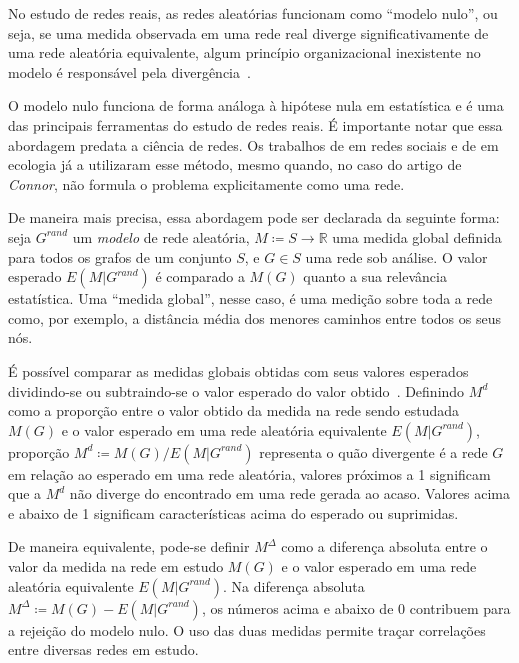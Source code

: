 \documentclass[12pt,a4paper,final]{article}
\newcommand{\R}{\mathbb{R}} %
\newcommand{\defn}{\coloneqq} %
\begin{document}
No estudo de redes reais, as redes aleatórias funcionam como \enquote{modelo nulo}, ou seja, se uma medida observada em uma rede real diverge significativamente de uma rede aleatória equivalente, algum princípio organizacional inexistente no modelo é responsável pela divergência~\cite{Zweig2016-rb}.

O modelo nulo funciona de forma análoga à hipótese nula em estatística e é uma das principais ferramentas do estudo de redes reais. É importante notar que essa abordagem predata a ciência de redes. Os trabalhos de  em redes sociais e de  em ecologia já a utilizaram esse método, mesmo quando, no caso do artigo de \textit{Connor}, não formula o problema explicitamente como uma rede.

De maneira mais precisa, essa abordagem pode ser declarada da seguinte forma: seja $G^\textit{rand}$ um \textit{modelo} de rede aleatória, $M \defn S \to \R$ uma medida global definida para todos os grafos de um conjunto $S$, e $G \in S$ uma rede sob análise. O valor esperado $E(M|G^\textit{rand})$ é comparado a $M(G)$ quanto a sua relevância estatística. Uma \enquote{medida global}, nesse caso, é uma medição sobre toda a rede como, por exemplo, a distância média dos menores caminhos entre todos os seus nós.

É possível comparar as medidas globais obtidas com seus valores esperados dividindo-se ou subtraindo-se o valor esperado do valor obtido~\cite{Zweig2016-rb}. Definindo $M^d$ como a proporção entre o valor obtido da medida na rede sendo estudada $M(G)$ e o valor esperado em uma rede aleatória equivalente $E(M|G^\textit{rand})$, proporção $M^d \defn M(G) / E(M|G^\textit{rand})$ representa o quão divergente é a rede $G$ em relação ao esperado em uma rede aleatória, valores próximos a 1 significam que a $M^d$ não diverge do encontrado em uma rede gerada ao acaso. Valores acima e abaixo de 1 significam características acima do esperado ou suprimidas.

De maneira equivalente, pode-se definir $M^\Delta$ como a diferença absoluta entre o valor da medida na rede em estudo $M(G)$ e o valor esperado em uma rede aleatória equivalente $E(M|G^\textit{rand})$. Na diferença absoluta $M^\Delta \defn M(G) - E(M|G^\textit{rand})$, os números acima e abaixo de 0 contribuem para a rejeição do modelo nulo. O uso das duas medidas permite traçar correlações entre diversas redes em estudo.
\end{document}
